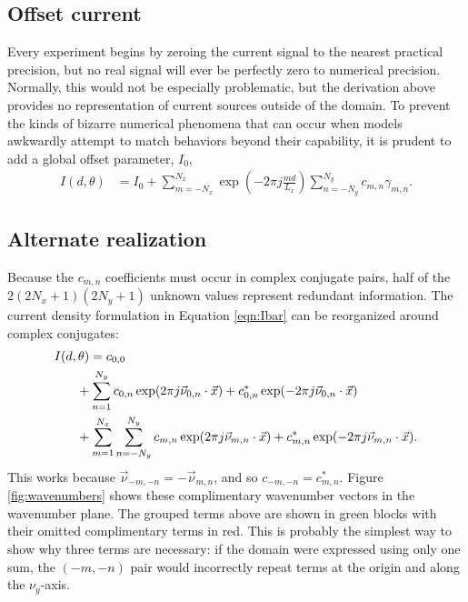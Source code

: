 \documentclass{article}
\def\x{\vec{x}}
\def\vnu{\vec{\nu}_{m,n}}
\begin{document}
\subsection{Offset current}

Every experiment begins by zeroing the current signal to the nearest practical precision, but no real signal will ever be perfectly zero to numerical precision.  Normally, this would not be especially problematic, but the derivation above provides no representation of current sources outside of the domain.  To prevent the kinds of bizarre numerical phenomena that can occur when models awkwardly attempt to match behaviors beyond their capability, it is prudent to add a global offset parameter, $I_0$,  
\begin{align}
I(d,\theta) &= I_0 + \sum_{m=-N_x}^{N_x} \exp\left(-2\pi j \frac{md}{L_x} \right) \sum_{n=-N_y}^{N_y} c_{m,n}\gamma_{m,n}\label{eqn:I}.
\end{align}

\subsection{Alternate realization}

Because the $c_{m,n}$ coefficients must occur in complex conjugate pairs, half of the $2(2N_x+1)(2N_y+1)$ unknown values represent redundant information.  The current density formulation in Equation \ref{eqn:Ibar} can be reorganized around complex conjugates:
\begin{align}
I(d,\theta) &= c_{0,0} \nonumber\\
& \hspace{-1em} + \sum_{n=1}^{N_y} c_{0,n} \exp(2\pi j \vec{\nu}_{0,n} \cdot \x) + c_{0,n}^* \exp(-2\pi j \vec{\nu}_{0,n} \cdot \x)\nonumber\\
& \hspace{-1em} + \sum_{m=1}^{N_x}\sum_{n=-N_y}^{N_y} c_{m,n} \exp(2\pi j \vec{\nu}_{m,n} \cdot \x) + c_{m,n}^* \exp(-2\pi j \vec{\nu}_{m,n} \cdot \x).
\end{align}
This works because $\vec{\nu}_{-m,-n} = -\vnu$, and so $c_{-m,-n} = c_{m,n}^*$.  Figure \ref{fig:wavenumbers} shows these complimentary wavenumber vectors in the wavenumber plane.  The grouped terms above are shown in green blocks with their omitted complimentary terms in red.  This is probably the simplest way to show why three terms are necessary: if the domain were expressed using only one sum, the $(-m,-n)$ pair would incorrectly repeat terms at the origin and along the $\nu_y$-axis.  
\end{document}
